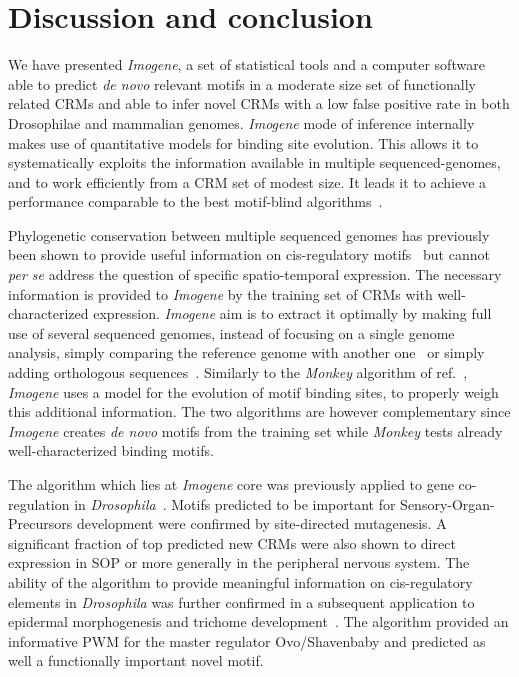 \documentclass[a4,center,fleqn]{NAR}
\begin{document}
\section{Discussion and conclusion}

We have presented \textit{Imogene}, a set of statistical tools  and a computer
software able to predict {\em de novo} relevant motifs in a moderate size set
of functionally related CRMs and able to infer novel CRMs with a low false
positive rate in both Drosophilae and mammalian genomes.
\textit{Imogene} mode of inference internally makes use of quantitative
models for binding site evolution.
This allows it to  systematically exploits the information available in
multiple sequenced-genomes, and to work efficiently from a CRM set of modest
size.
It leads it to achieve a performance comparable to the best motif-blind
algorithms~\cite{kantorovitz2009motif}.  

Phylogenetic conservation between multiple sequenced genomes has previously
been shown to provide useful information on cis-regulatory
motifs~\cite{xie2005systematic, ettwiller2005discovery, stark2007discovery} but
cannot {\em per se} address the question of specific spatio-temporal
expression.
The necessary information is provided to {\em Imogene} by  the training set of
CRMs with well-characterized expression.
{\em Imogene} aim is to extract it optimally by making full use of several
sequenced genomes, instead of focusing on a single genome~\cite{Herrmann2012uq}
analysis, simply comparing the reference genome with another
one~\cite{wang2003combining, grad2004prediction, zhao2007identification} or
simply adding orthologous sequences~\cite{Busser:2012uq}.
Similarly 
to the {\em Monkey} algorithm of ref.~\cite{Moses:2004vn}, {\em Imogene} uses
a model for the evolution of motif binding sites, to properly weigh this
additional information. 
The two algorithms are however complementary since {\em Imogene} creates {\em
de novo} motifs from the training set while {\em Monkey} tests  already
well-characterized binding motifs.

The algorithm which lies at \textit{Imogene} core was previously applied to
gene co-regulation in {\em Drosophila}~\cite{Rouault:2010fk}.
Motifs predicted to be important for Sensory-Organ-Precursors development were
confirmed by site-directed mutagenesis.
A significant fraction of top predicted new CRMs were also shown to direct
expression in SOP or more generally in the peripheral nervous system.
The ability of the algorithm  to provide meaningful information on
cis-regulatory elements in {\em Drosophila} was further confirmed in
a subsequent application to epidermal morphogenesis and trichome
development~\cite{Menoret2012}.
The algorithm provided an informative PWM for the master regulator
Ovo/Shavenbaby and predicted as well a functionally important novel motif. 
\end{document}
